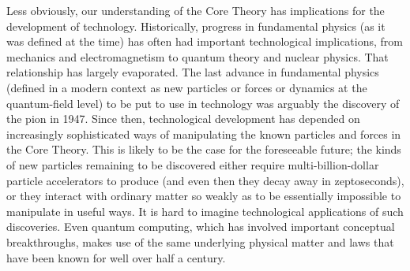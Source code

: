 \documentclass[12pt,letterpaper]{article}
\begin{document}
Less obviously, our understanding of the Core Theory has implications for the development of technology.
Historically, progress in fundamental physics (as it was defined at the time) has often had important technological implications, from mechanics and electromagnetism to quantum theory and nuclear physics.
That relationship has largely evaporated.
The last advance in fundamental physics (defined in a modern context as new particles or forces or dynamics at the quantum-field level) to be put to use in technology was arguably the discovery of the pion in 1947.
Since then, technological development has depended on increasingly sophisticated ways of manipulating the known particles and forces in the Core Theory.
This is likely to be the case for the foreseeable future; the kinds of new particles remaining to be discovered either require multi-billion-dollar particle accelerators to produce (and even then they decay away in zeptoseconds), or they interact with ordinary matter so weakly as to be essentially impossible to manipulate in useful ways.
It is hard to imagine technological applications of such discoveries.
Even quantum computing, which has involved important conceptual breakthroughs, makes use of the same underlying physical matter and laws that have been known for well over half a century.
\end{document}
